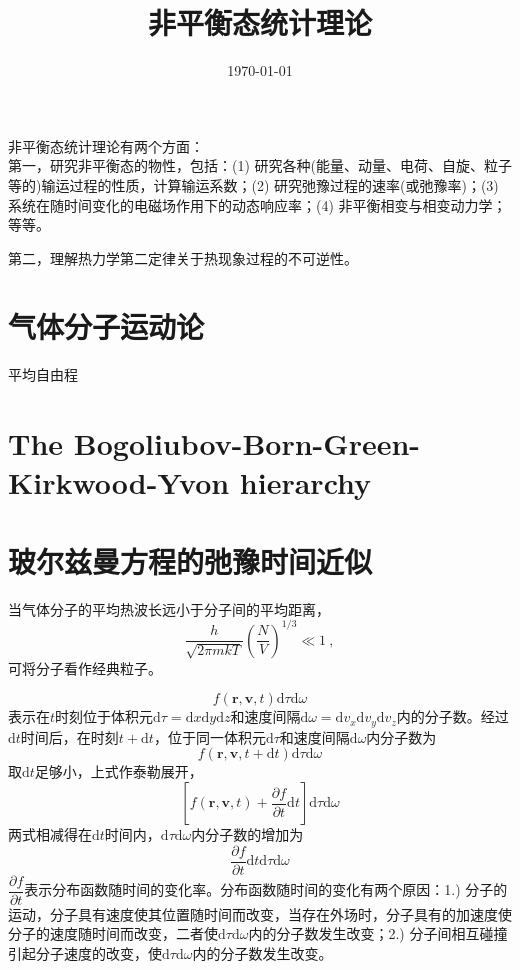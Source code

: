 \documentclass[12pt,a4paper]{article}
\title{非平衡态统计理论}
\author{}
\date{\today}
\renewcommand{\vec}[1]{\boldsymbol{#1}}
\newcommand{\dif}{\mathrm{d}}
\begin{document}
\maketitle

\cite{2007热力学与统计物理学} 非平衡态统计理论有两个方面：\\
第一，研究非平衡态的物性，包括：(1) 研究各种(能量、动量、电荷、自旋、粒子等的)输运过程的性质，计算输运系数；(2) 研究弛豫过程的速率(或弛豫率)；(3) 系统在随时间变化的电磁场作用下的动态响应率；(4) 非平衡相变与相变动力学；等等。

第二，理解热力学第二定律关于热现象过程的不可逆性。

\section{气体分子运动论}

平均自由程



\section{The Bogoliubov-Born-Green-Kirkwood-Yvon hierarchy}
\cite{2007spp..book.....K} 


\section{玻尔兹曼方程的弛豫时间近似}
\cite{2013热力学} 当气体分子的平均热波长远小于分子间的平均距离，
\begin{equation}
\frac{h}{\sqrt{2\pi m kT}} \left(\frac{N}{V} \right)^{1/3}  \ll 1 ~,
\end{equation}
可将分子看作经典粒子。

\begin{equation}
f(\vec{r}, \vec{v}, t) \dif \tau \dif \omega
\end{equation}
表示在$t$时刻位于体积元$\dif \tau = \dif x \dif y \dif z$和速度间隔$\dif \omega = \dif v_x \dif v_y \dif v_z$内的分子数。经过$\dif t$时间后，在时刻$t+\dif t$，位于同一体积元$\dif \tau$和速度间隔$\dif \omega$内分子数为
\begin{equation}
f(\vec{r}, \vec{v}, t+\dif t) \dif \tau \dif \omega
\end{equation}
取$\dif t$足够小，上式作泰勒展开，
\begin{equation}
\left[f(\vec{r}, \vec{v}, t) +\frac{\partial f}{\partial t} \dif t \right] \dif \tau \dif \omega
\end{equation}
两式相减得在$\dif t$时间内，$\dif \tau \dif \omega$内分子数的增加为
\begin{equation}
\frac{\partial f}{\partial t} \dif t \dif \tau \dif \omega
\end{equation}
$\dfrac{\partial f}{\partial t} $表示分布函数随时间的变化率。分布函数随时间的变化有两个原因：1.) 分子的运动，分子具有速度使其位置随时间而改变，当存在外场时，分子具有的加速度使分子的速度随时间而改变，二者使$\dif \tau \dif \omega$内的分子数发生改变；2.) 分子间相互碰撞引起分子速度的改变，使$\dif \tau \dif \omega$内的分子数发生改变。
\end{document}

